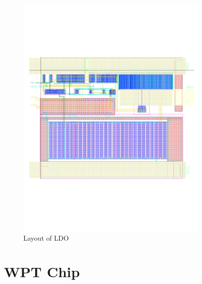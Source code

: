 \documentclass[12pt,a4paper,UKenglish]{report}
\begin{document}
\begin{appendices}
\begin{figure} [!htbp]	%
 	\centering
  	\includegraphics[width=0.85\textwidth]{appendix/layout_ldo_p.pdf} 
 	\caption{Layout of LDO} 
	\label{fig:appen_layout_ldo} 
\end{figure}




\chapter{WPT Chip}


\end{appendices}
\end{document}

